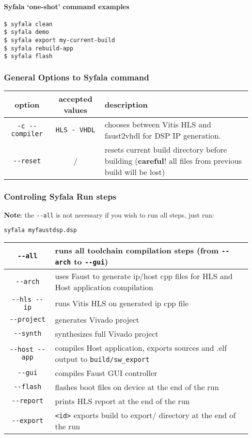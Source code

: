 \paragraph{Syfala `one-shot' command examples}

\begin{verbatim}
$ syfala clean
$ syfala demo
$ syfala export my-current-build
$ syfala rebuild-app
$ syfala flash
\end{verbatim}

\subsubsection{General Options to Syfala command}

\begin{tabular}{|c|c|p{8cm}|}
  \toprule
option & accepted values & description \\
\midrule
\texttt{-c\ -\/-compiler} & \texttt{HLS\ -\ VHDL} & chooses between
Vitis HLS and faust2vhdl for DSP IP generation. \\
\texttt{-\/-reset} & / & resets current build directory before building
(\textbf{careful}! all files from previous build will be lost) \\
\bottomrule
\end{tabular}

\subsubsection{Controling Syfala Run steps}

\textbf{Note}: the \texttt{-\/-all} is not necessary if you wish to run
all steps, just run:

\texttt{syfala\ myfaustdsp.dsp}

\begin{tabular}{|c|p{12cm}|}
  \toprule
\texttt{-\/-all} & runs all toolchain compilation steps (from
\texttt{-\/-arch} to \texttt{-\/-gui}) \\
\midrule
\texttt{-\/-arch} & uses Faust to generate ip/host cpp files for HLS and
Host application compilation \\
\texttt{-\/-hls\ -\/-ip} & runs Vitis HLS on generated ip cpp file \\
\texttt{-\/-project} & generates Vivado project \\
\texttt{-\/-synth} & synthesizes full Vivado project \\
\texttt{-\/-host\ -\/-app} & compiles Host application, exports sources
and .elf output to \texttt{build/sw\_export} \\
\texttt{-\/-gui} & compiles Faust GUI controller \\
\texttt{-\/-flash} & flashes boot files on device at the end of the
run \\
\texttt{-\/-report} & prints HLS report at the end of the run \\
\texttt{-\/-export} & \texttt{\textless{}id\textgreater{}} exports build
to export/ directory at the end of the run \\
\bottomrule
\end{tabular}

